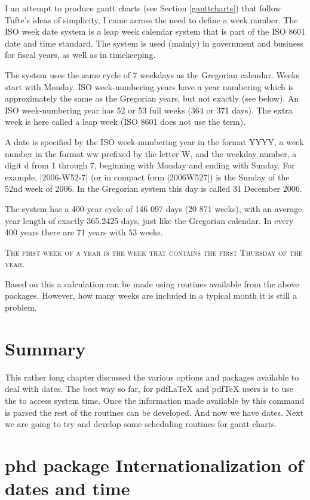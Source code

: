 I an attempt to produce gantt charts (see Section \ref{ganttcharts}) that follow Tufte's ideas of simplicity, I came across the need to define a week number. The ISO week date system is a leap week calendar system that is part of the ISO 8601 date and time standard. The system is used (mainly) in government and business for fiscal years, as well as in timekeeping.

The system uses the same cycle of 7 weekdays as the Gregorian calendar. Weeks start with Monday. ISO week-numbering years have a year numbering which is approximately the same as the Gregorian years, but not exactly (see below). An ISO week-numbering year has 52 or 53 full weeks (364 or 371 days). The extra week is here called a leap week (ISO 8601 does not use the term).



A date is specified by the ISO week-numbering year in the format YYYY, a week number in the format ww prefixed by the letter W, and the weekday number, a digit d from 1 through 7, beginning with Monday and ending with Sunday. For example, |2006-W52-7| (or in compact form |2006W527|) is the Sunday of the 52nd week of 2006. In the Gregorian system this day is called 31 December 2006.

The system has a 400-year cycle of 146 097 days (20 871 weeks), with an average year length of exactly 365.2425 days, just like the Gregorian calendar. In every 400 years there are 71 years with 53 weeks.

\textsc{The first week of a year is the week that contains the first Thursday of the year.}

Based on this a calculation can be made using routines available from the above packages. However, how many weeks are included in a typical month it is still a problem.


\section{Summary}

This rather long chapter discussed the various options and packages available to deal with dates. The best way so far, for pdfLaTeX and pdfTeX users is to use the  to access system time. Once the information made available by this command is parsed the rest of the routines can be developed. And now we have dates. Next we are going to try and develop some scheduling routines for gantt charts.

\section{phd package Internationalization of dates and time}

